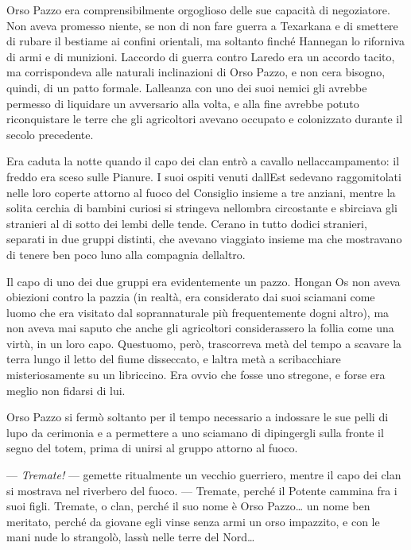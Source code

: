 Orso Pazzo era comprensibilmente orgoglioso delle sue capacità di
negoziatore. Non aveva promesso niente, se non di non fare guerra a
Texarkana e di smettere di rubare il bestiame ai confini orientali, ma
soltanto finché Hannegan lo riforniva di armi e di munizioni.
L\textquotesingle accordo di guerra contro Laredo era un accordo tacito,
ma corrispondeva alle naturali inclinazioni di Orso Pazzo, e non
c\textquotesingle era bisogno, quindi, di un patto formale.
L\textquotesingle alleanza con uno dei suoi nemici gli avrebbe permesso
di liquidare un avversario alla volta, e alla fine avrebbe potuto
riconquistare le terre che gli agricoltori avevano occupato e
colonizzato durante il secolo precedente.

Era caduta la notte quando il capo dei clan entrò a cavallo
nell\textquotesingle accampamento: il freddo era sceso sulle Pianure. I
suoi ospiti venuti dall\textquotesingle Est sedevano raggomitolati nelle
loro coperte attorno al fuoco del Consiglio insieme a tre anziani,
mentre la solita cerchia di bambini curiosi si stringeva
nell\textquotesingle ombra circostante e sbirciava gli stranieri al di
sotto dei lembi delle tende. C\textquotesingle erano in tutto dodici
stranieri, separati in due gruppi distinti, che avevano viaggiato
insieme ma che mostravano di tenere ben poco l\textquotesingle uno alla
compagnia dell\textquotesingle altro.

Il capo di uno dei due gruppi era evidentemente un pazzo. Hongan Os non
aveva obiezioni contro la pazzia (in realtà, era considerato dai suoi
sciamani come l\textquotesingle uomo che era visitato dal soprannaturale
più frequentemente d\textquotesingle ogni altro), ma non aveva mai
saputo che anche gli agricoltori considerassero la follia come una
virtù, in un loro capo. Quest\textquotesingle uomo, però, trascorreva
metà del tempo a scavare la terra lungo il letto del fiume disseccato, e
l\textquotesingle altra metà a scribacchiare misteriosamente su un
libriccino. Era ovvio che fosse uno stregone, e forse era meglio non
fidarsi di lui.

Orso Pazzo si fermò soltanto per il tempo necessario a indossare le sue
pelli di lupo da cerimonia e a permettere a uno sciamano di dipingergli
sulla fronte il segno del totem, prima di unirsi al gruppo attorno al
fuoco.

--- \emph{Tremate!} --- gemette ritualmente un vecchio guerriero, mentre
il capo dei clan si mostrava nel riverbero del fuoco. --- Tremate,
perché il Potente cammina fra i suoi figli. Tremate, o clan, perché il
suo nome è Orso Pazzo\ldots{} un nome ben meritato, perché da giovane
egli vinse senza armi un orso impazzito, e con le mani nude lo
strangolò, lassù nelle terre del Nord\ldots{}

